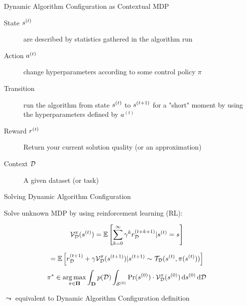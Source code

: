 \begin{frame}[c]{Dynamic Algorithm Configuration as Contextual MDP }


\begin{description}
	\item[State $s^{(t)}$] are described by statistics gathered in the algorithm run
	\pause
	\item[Action $a^{(t)}$] change hyperparameters according to some control policy $\pi$
	\pause
	\item[Transition] run the algorithm from state $s^{(t)}$ to $s^{(t+1)}$ for a "short" moment by using the hyperparameters defined by $a^{(t)}$
	\pause
	\item[Reward $r^{(t)}$] Return your current solution quality (or an approximation)
	\pause
	\item[Context $\mathcal{D}$] A given dataset (or task)
\end{description}

\bigskip
	
\centering

	
	
\end{frame}
\begin{frame}[c]{Solving Dynamic Algorithm Configuration}

Solve unknown MDP by using reinforcement learning (RL):

\begin{equation}
\mathcal{V}_{\mathcal{D}}^\pi(s^{(t)}) =  \mathbb{E} \left[\sum_{k=0}^\infty\gamma^k r^{(t+k+1)}_{\mathcal{D}}| s^{(t)}=s \right]\nonumber
\end{equation}
\pause

\begin{equation}
 = \mathbb{E} \left[ r^{(t+1)}_{\mathcal{D}}+\gamma\mathcal{V}_{\mathcal{D}}^\pi(s^{(t+1)})| s^{(t+1)} \sim \mathcal{T}_{\mathcal{D}}(s^{(t)}, \pi(s^{(t)})) \right] \nonumber
\end{equation}
\pause
\begin{equation}
\pi^* \in
\operatorname*{arg\,max}_{\pi \in \mathbf{\Pi}}
\int_{\mathbf{D}} p(\mathcal{D}) \int_{\mathcal{S}^{(0)}} \Pr(s^{(0)}) \cdot \mathcal{V}^\pi_{\mathcal{D}}(s^{(0)}) \mathop{}\!\mathrm{d} s^{(0)} \mathop{}\!\mathrm{d} \mathcal{D} \nonumber
\end{equation}

\bigskip
\pause
$\leadsto$ equivalent to Dynamic Algorithm Configuration definition


\end{frame}
